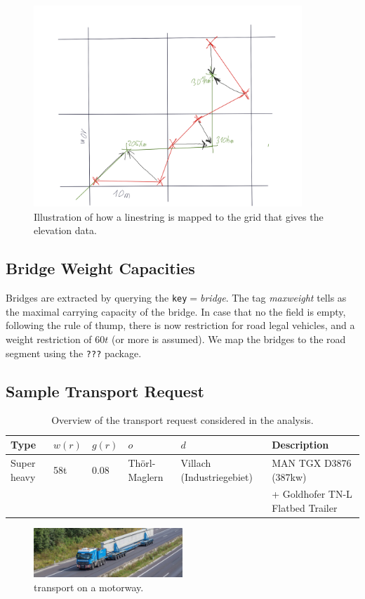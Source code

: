 \begin{figure}[!ht]
  \includegraphics[width=0.9\textwidth]{./figures/mapping.png}
  \caption{Illustration of how a linestring is mapped to the grid that gives the elevation data.}
  \label{fig:mapelev}
\end{figure}


\subsection{Bridge Weight Capacities}
Bridges are extracted by querying the \texttt{key}$=$\textit{bridge}. The tag \textit{maxweight}
tells as the maximal carrying capacity of the bridge. In case that no the field is empty,
following the rule of thump, there is now restriction for road legal vehicles, and
a weight restriction of $60t$ (or more is assumed).
We map the bridges to the road segment using the \texttt{???} package.


\subsection{Sample Transport Request}

\begin{table}[!ht]
  \caption{Overview of the transport request considered in the analysis.}
  \label{tab:request}
  \centering
\begin{tabular}{l|llll|l}
Type  & $w(r)$  & $g(r)$  & $o$  & $d$ & Description\\ \hline\hline
Super heavy  & 58t  & 0.08 & Thörl-Maglern  & Villach (Industriegebiet) &  MAN TGX D3876 (387kw)\\
&&&&& + Goldhofer TN-L Flatbed Trailer
\\ \hline
\end{tabular}
\end{table}

\begin{figure}[!ht]
  \centering
  \includegraphics[width=0.5\textwidth]{./figures/felbert.jpg}
  \caption{\ohc transport on a motorway.}
  \label{fig:truck}
\end{figure}
